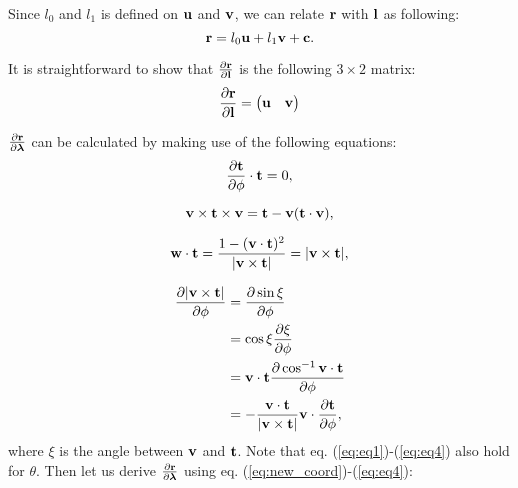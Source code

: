 \documentclass[12pt,a4paper]{scrarticle}
\begin{document}
Since $l_0$ and $l_1$ is defined on $\mathbf{u}$ and $\mathbf{v}$, 
we can relate $\mathbf{r}$ with $\mathbf{l}$ as following: 
\begin{equation}\label{eq:r_in_uv}
    \mathbf{r} = l_0 \mathbf{u} + l_1 \mathbf{v} +  \mathbf{c}.
\end{equation}

It is straightforward to show that
$\frac{\partial{\mathbf{r}}}{\partial{\mathbf{l}}}$ is the following $3 \times 2$ matrix: 
\begin{equation}
\frac{\partial{\mathbf{r}}}{\partial{\mathbf{l}}}=
    \begin{pmatrix}
     \mathbf{u} & \mathbf{v} 
    \end{pmatrix}    
\end{equation}

$\frac{\partial{\mathbf{r}}}{\partial{\boldsymbol{\lambda}}}$ can be calculated by making use of the following equations:
\begin{equation}\label{eq:eq1}
    \frac{\partial \mathbf{t}}{\partial \phi} \cdot \mathbf{t} = 0,
\end{equation}

\begin{equation}\label{eq:eq2}
    \mathbf{v} \times \mathbf{t} \times \mathbf{v} = \mathbf{t} - \mathbf{v}(\mathbf{t} \cdot \mathbf{v}),
\end{equation}

\begin{equation}\label{eq:eq3}
    \mathbf{w} \cdot \mathbf{t} = \frac{1- (\mathbf{v} \cdot \mathbf{t})^2}{|\mathbf{v} \times \mathbf{t}|} = |\mathbf{v} \times \mathbf{t}|,
\end{equation}

\begin{align}\label{eq:eq4}
   \frac{\partial |\mathbf{v} \times \mathbf{t}|}{\partial \phi} & = \frac{\partial \sin{\xi}}{\partial \phi} \nonumber \\
   & = \cos{\xi} \frac{\partial \xi}{\partial \phi} \nonumber \\
   & = \mathbf{v} \cdot \mathbf{t} \frac{\partial \cos^{-1}{\mathbf{v} \cdot \mathbf{t}}}{\partial \phi} \nonumber \\
   & = - \frac{\mathbf{v} \cdot \mathbf{t}}{|\mathbf{v} \times \mathbf{t}|} \mathbf{v} \cdot \frac{\partial \mathbf{t}}{\partial \phi},
\end{align}
where $\xi$ is the angle between $\mathbf{v}$ and $\mathbf{t}$. Note that eq. (\ref{eq:eq1})-(\ref{eq:eq4}) also hold for $\theta$. Then let us derive $\frac{\partial{\mathbf{r}} }{\partial{\boldsymbol{\lambda}}}$ using eq. (\ref{eq:new_coord})-(\ref{eq:eq4}):
\end{document}

